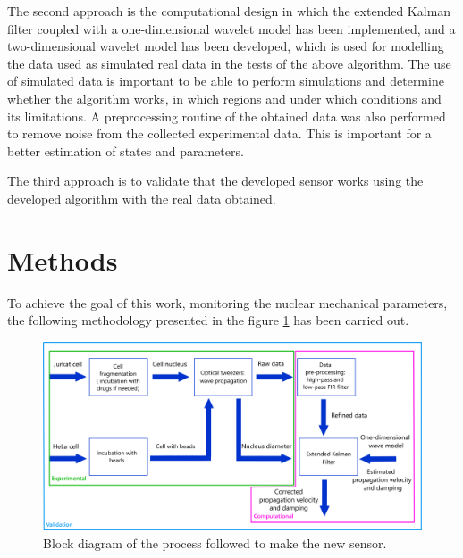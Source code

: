\documentclass[12pt, a4paper]{article} %
\begin{document}
The second approach is the computational design in which the extended Kalman filter coupled with a one-dimensional wavelet model has been implemented, and a two-dimensional wavelet model has been developed, which is used for modelling the data used as simulated real data in the tests of the above algorithm.  The use of simulated data is important to be able to perform simulations and determine whether the algorithm works, in which regions and under which conditions and its limitations. A preprocessing routine of the obtained data was also performed to remove noise from the collected experimental data. This is important for a better estimation of states and parameters.

The third approach is to validate that the developed sensor works using the developed algorithm with the real data obtained. 

\newpage
\setlength{\parskip}{0mm}

\section{Methods}

To achieve the goal of this work, monitoring the nuclear mechanical parameters, the following methodology presented in the figure \ref{fig:esquema_trabajo} has been carried out.

\setlength{\parskip}{4mm}

\begin{figure}[htbp]
  \centering
  \includegraphics[width=1\textwidth]{figures/esquema_trabajo_metodos_2.png}
  \caption{Block diagram of the process followed to make the new sensor.}
  \label{fig:esquema_trabajo}
\end{figure}
\end{document}
